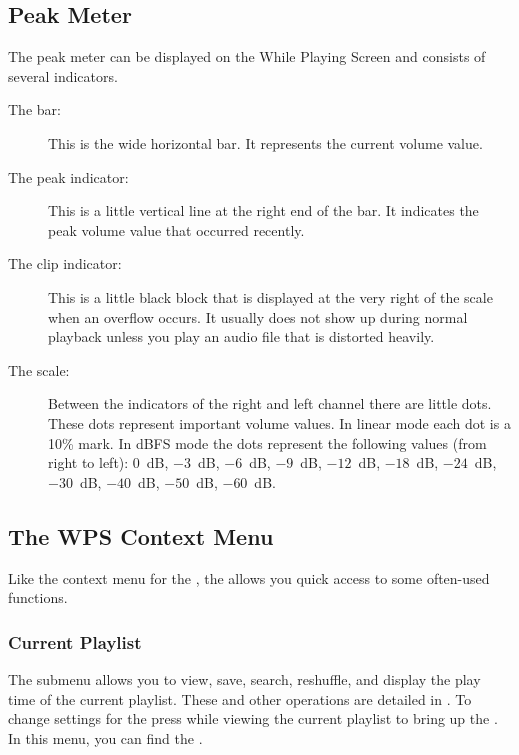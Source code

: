 \subsection{\label{ref:peak_meter}Peak Meter}
The peak meter can be displayed on the While Playing Screen and consists of
several indicators.

\begin{description}
\item [The bar:]
  This is the wide horizontal bar. It represents the current volume value.
\item [The peak indicator:]
  This is a little vertical line at the right end of the bar. It indicates
  the peak volume value that occurred recently.
\item [The clip indicator:]
  This is a little black block that is displayed at the very right of the
  scale when an overflow occurs. It usually does not show up during normal
  playback unless you play an audio file that is distorted heavily.
\item [The scale:]
  Between the indicators of the right and left channel there are little dots.
  These dots represent important volume values. In linear mode each dot is a
  10\% mark. In dBFS mode the dots represent the following values (from right
  to left): 0~dB, $-3$~dB, $-6$~dB, $-9$~dB, $-12$~dB, $-18$~dB, $-24$~dB, $-30$~dB,
  $-40$~dB, $-50$~dB, $-60$~dB.
\end{description}

\subsection{\label{sec:contextmenu}The WPS Context Menu}
Like the context menu for the , the 
allows you quick access to some often-used functions.

\subsubsection{Current Playlist}
The  submenu allows you to view, save, search, reshuffle,
and display the play time of the current playlist. These and other operations
are detailed in . To change settings for
the  press \ActionStdContext{} while viewing the
current playlist to bring up the . In this
menu, you can find the .

